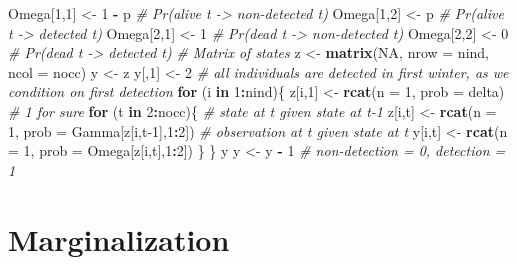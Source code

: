 \documentclass[
  12pt,
]{krantz}
\newenvironment{Shaded}{\begin{snugshade}}{\end{snugshade}}
\newcommand{\AttributeTok}[1]{\textcolor[rgb]{0.13,0.29,0.53}{#1}}
\newcommand{\CommentTok}[1]{\textcolor[rgb]{0.56,0.35,0.01}{\textit{#1}}}
\newcommand{\ConstantTok}[1]{\textcolor[rgb]{0.56,0.35,0.01}{#1}}
\newcommand{\ControlFlowTok}[1]{\textcolor[rgb]{0.13,0.29,0.53}{\textbf{#1}}}
\newcommand{\DecValTok}[1]{\textcolor[rgb]{0.00,0.00,0.81}{#1}}
\newcommand{\FunctionTok}[1]{\textcolor[rgb]{0.13,0.29,0.53}{\textbf{#1}}}
\newcommand{\NormalTok}[1]{#1}
\newcommand{\OtherTok}[1]{\textcolor[rgb]{0.56,0.35,0.01}{#1}}
\newcommand{\SpecialCharTok}[1]{\textcolor[rgb]{0.81,0.36,0.00}{\textbf{#1}}}
\begin{document}
\begin{Shaded}
\begin{Highlighting}[]
\NormalTok{Omega[}\DecValTok{1}\NormalTok{,}\DecValTok{1}\NormalTok{] }\OtherTok{\textless{}{-}} \DecValTok{1} \SpecialCharTok{{-}}\NormalTok{ p      }\CommentTok{\# Pr(alive t {-}\textgreater{} non{-}detected t)}
\NormalTok{Omega[}\DecValTok{1}\NormalTok{,}\DecValTok{2}\NormalTok{] }\OtherTok{\textless{}{-}}\NormalTok{ p          }\CommentTok{\# Pr(alive t {-}\textgreater{} detected t)}
\NormalTok{Omega[}\DecValTok{2}\NormalTok{,}\DecValTok{1}\NormalTok{] }\OtherTok{\textless{}{-}} \DecValTok{1}          \CommentTok{\# Pr(dead t {-}\textgreater{} non{-}detected t)}
\NormalTok{Omega[}\DecValTok{2}\NormalTok{,}\DecValTok{2}\NormalTok{] }\OtherTok{\textless{}{-}} \DecValTok{0}          \CommentTok{\# Pr(dead t {-}\textgreater{} detected t)}
\CommentTok{\# Matrix of states}
\NormalTok{z }\OtherTok{\textless{}{-}} \FunctionTok{matrix}\NormalTok{(}\ConstantTok{NA}\NormalTok{, }\AttributeTok{nrow =}\NormalTok{ nind, }\AttributeTok{ncol =}\NormalTok{ nocc)}
\NormalTok{y }\OtherTok{\textless{}{-}}\NormalTok{ z}
\NormalTok{y[,}\DecValTok{1}\NormalTok{] }\OtherTok{\textless{}{-}} \DecValTok{2} \CommentTok{\# all individuals are detected in first winter, as we condition on first detection}
\ControlFlowTok{for}\NormalTok{ (i }\ControlFlowTok{in} \DecValTok{1}\SpecialCharTok{:}\NormalTok{nind)\{}
\NormalTok{  z[i,}\DecValTok{1}\NormalTok{] }\OtherTok{\textless{}{-}} \FunctionTok{rcat}\NormalTok{(}\AttributeTok{n =} \DecValTok{1}\NormalTok{, }\AttributeTok{prob =}\NormalTok{ delta) }\CommentTok{\# 1 for sure}
  \ControlFlowTok{for}\NormalTok{ (t }\ControlFlowTok{in} \DecValTok{2}\SpecialCharTok{:}\NormalTok{nocc)\{}
    \CommentTok{\# state at t given state at t{-}1}
\NormalTok{    z[i,t] }\OtherTok{\textless{}{-}} \FunctionTok{rcat}\NormalTok{(}\AttributeTok{n =} \DecValTok{1}\NormalTok{, }\AttributeTok{prob =}\NormalTok{ Gamma[z[i,t}\DecValTok{{-}1}\NormalTok{],}\DecValTok{1}\SpecialCharTok{:}\DecValTok{2}\NormalTok{]) }
    \CommentTok{\# observation at t given state at t}
\NormalTok{    y[i,t] }\OtherTok{\textless{}{-}} \FunctionTok{rcat}\NormalTok{(}\AttributeTok{n =} \DecValTok{1}\NormalTok{, }\AttributeTok{prob =}\NormalTok{ Omega[z[i,t],}\DecValTok{1}\SpecialCharTok{:}\DecValTok{2}\NormalTok{]) }
\NormalTok{  \}}
\NormalTok{\}}
\NormalTok{y}
\NormalTok{y }\OtherTok{\textless{}{-}}\NormalTok{ y }\SpecialCharTok{{-}} \DecValTok{1} \CommentTok{\# non{-}detection = 0, detection = 1}
\end{Highlighting}
\end{Shaded}

\section{Marginalization}\label{marginalization}
\end{document}
